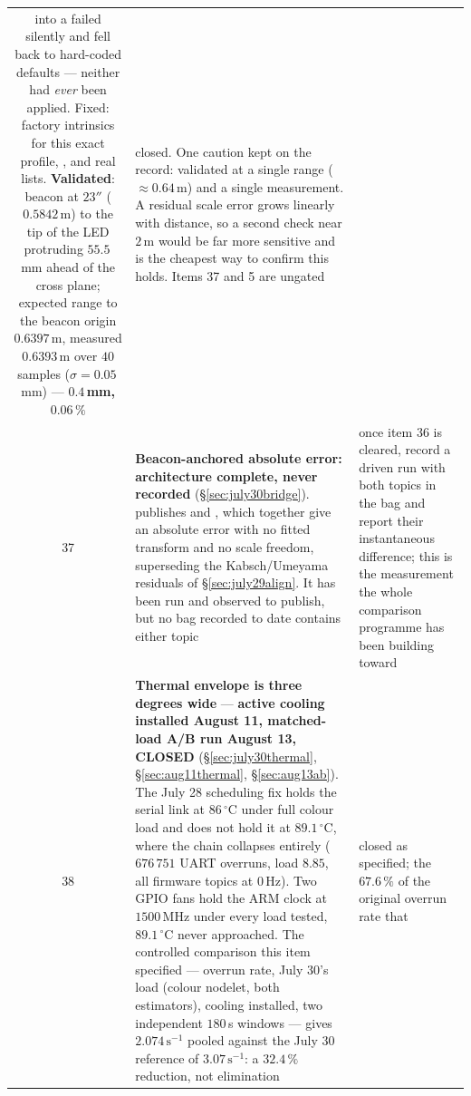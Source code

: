 \begin{longtable}{@{}cL{6.2cm}L{6.8cm}@{}}
     into a  failed silently and fell
    back to hard-coded defaults --- neither had \emph{ever} been applied.
    Fixed: factory intrinsics for this exact profile, ,
    and real  lists. \textbf{Validated}: beacon at
    $23''$ ($0.5842$\,m) to the tip of the LED protruding $55.5$\,mm ahead
    of the cross plane; expected range to the beacon origin
    $0.6397$\,m, measured $0.6393$\,m over $40$ samples
    ($\sigma = 0.05$\,mm) --- \textbf{$0.4$\,mm, $0.06\,\%$} &
    closed. One caution kept on the record: validated at a single range
    ($\approx0.64$\,m) and a single measurement. A residual scale error
    grows linearly with distance, so a second check near $2$\,m would be far
    more sensitive and is the cheapest way to confirm this holds. Items 37
    and 5 are ungated \\
37 & \textbf{Beacon-anchored absolute error: architecture complete, never
    recorded} (\S\ref{sec:july30bridge}). 
    publishes  and ,
    which together give an absolute error with no fitted transform and no
    scale freedom, superseding the Kabsch/Umeyama residuals of
    \S\ref{sec:july29align}. It has been run and observed to publish, but
    no bag recorded to date contains either topic &
    once item 36 is cleared, record a driven run with both topics in the
    bag and report their instantaneous difference; this is the measurement
    the whole comparison programme has been building toward \\
38 & \textbf{Thermal envelope is three degrees wide} --- \textbf{active
    cooling installed August 11, matched-load A/B run August 13, CLOSED}
    (\S\ref{sec:july30thermal}, \S\ref{sec:aug11thermal}, \S\ref{sec:aug13ab}).
    The July 28 scheduling fix holds the serial link at $86\,^\circ$C under
    full colour load and does not hold it at $89.1\,^\circ$C, where the
    chain collapses entirely ($676\,751$ UART overruns, load $8.85$, all
    firmware topics at $0$\,Hz). Two GPIO fans hold the ARM clock at
    $1500$\,MHz under every load tested, $89.1\,^\circ$C never approached.
    The controlled comparison this item specified --- overrun rate,
    July 30's load (colour nodelet, both estimators), cooling installed,
    two independent $180$\,s windows --- gives $2.074\,\mathrm{s}^{-1}$
    pooled against the July 30 reference of $3.07\,\mathrm{s}^{-1}$: a
    $32.4\,\%$ reduction, not elimination &
    closed as specified; the $67.6\,\%$ of the original overrun rate that

\end{longtable}
